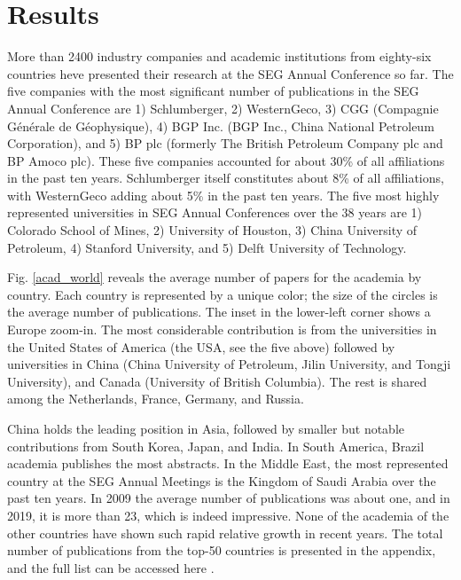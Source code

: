 \documentclass[geosciences,article,submit,moreauthors,pdftex]{Definitions/mdpi}
\begin{document}
\section{Results}

More than 2400 industry companies and academic institutions from eighty-six countries heve presented their research at the SEG Annual Conference so far. The five companies with the most significant number of publications in the SEG Annual Conference are 1) Schlumberger, 2) WesternGeco, 3) CGG (Compagnie Générale de Géophysique), 4) BGP Inc. (BGP Inc., China National Petroleum Corporation), and 5) BP plc (formerly The British Petroleum Company plc and BP Amoco plc). These five companies accounted for about 30\% of all affiliations in the past ten years. Schlumberger itself constitutes about 8\% of all affiliations, with WesternGeco adding about 5\% in the past ten years. The five most highly represented universities in SEG Annual Conferences over the 38 years are 1) Colorado School of Mines, 2) University of Houston, 3) China University of Petroleum, 4) Stanford University, and 5) Delft University of Technology. 
 
Fig. \ref{acad_world} reveals the average number of papers for the academia by country. Each country is represented by a unique color; the size of the circles is the average number of publications. The inset in the lower-left corner shows a Europe zoom-in. The most considerable contribution is from the universities in the United States of America (the USA, see the five above) followed by universities in China (China University of Petroleum, Jilin University, and Tongji University), and Canada (University of British Columbia). The rest is shared among the Netherlands, France, Germany, and Russia.

China holds the leading position in Asia, followed by smaller but notable contributions from South Korea, Japan, and India. In South America, Brazil academia publishes the most abstracts. In the Middle East, the most represented country at the SEG Annual Meetings is the Kingdom of Saudi Arabia over the past ten years. In 2009 the average number of publications was about one, and in 2019, it is more than 23, which is indeed impressive. None of the academia of the other countries have shown such rapid relative growth in recent years. The total number of publications from the top-50 countries is presented in the appendix, and the full list can be accessed here \citep{Eltsov2020}.
\end{document}
